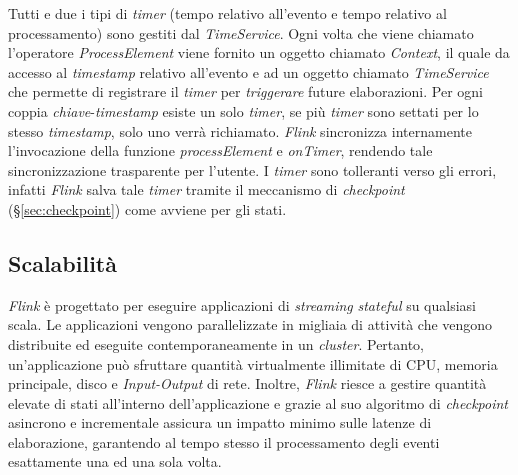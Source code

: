 \label{sec:timer}
\noindent Tutti e due i tipi di \textit{timer} (tempo relativo all'evento e tempo relativo al processamento) sono gestiti dal \textit{TimeService}. Ogni volta che viene chiamato l'operatore \textit{ProcessElement} viene fornito un oggetto chiamato \textit{Context}, il quale da accesso al \textit{\gls{timestamp}} relativo all'evento e ad un oggetto chiamato \textit{TimeService} che permette di registrare il \textit{timer} per \textit{triggerare} future elaborazioni. Per ogni coppia \textit{chiave}-\textit{\gls{timestamp}} esiste un solo \textit{timer}, se più \textit{timer} sono settati per lo stesso \textit{\gls{timestamp}}, solo uno verrà richiamato. \textit{Flink} sincronizza internamente l'invocazione della funzione \textit{processElement} e \textit{onTimer}, rendendo tale sincronizzazione trasparente per l'utente. I \textit{timer} sono tolleranti verso gli errori, infatti \textit{Flink} salva tale \textit{timer} tramite il meccanismo di \textit{checkpoint} (\S\ref{sec:checkpoint}) come avviene per gli stati.


\subsection{Scalabilità}
\textit{Flink} è progettato per eseguire applicazioni di \textit{streaming} \textit{\gls{stateful}} su qualsiasi scala. Le applicazioni vengono parallelizzate in migliaia di attività che vengono distribuite ed eseguite contemporaneamente in un \textit{\gls{cluster}}. Pertanto, un'applicazione può sfruttare quantità virtualmente illimitate di CPU, memoria principale, disco e \textit{Input-Output} di rete. Inoltre, \textit{Flink} riesce a gestire quantità elevate di stati all'interno dell'applicazione e grazie al suo algoritmo di \textit{checkpoint} asincrono e incrementale assicura un impatto minimo sulle latenze di elaborazione, garantendo al tempo stesso il processamento degli eventi esattamente una ed una sola volta.


